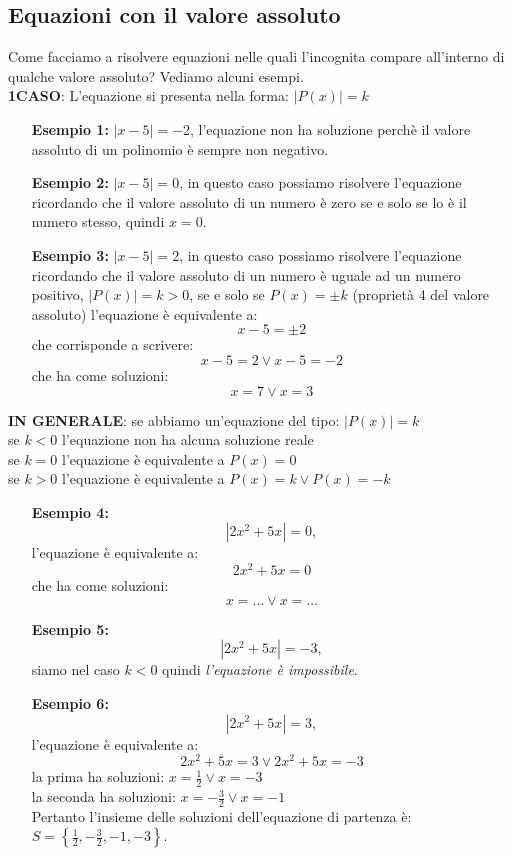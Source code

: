 \subsection{Equazioni con il valore assoluto}
Come facciamo a risolvere equazioni nelle quali l'incognita compare all'interno 
di qualche valore assoluto? Vediamo alcuni esempi.\\
\textbf{1\textdegree CASO}: L'equazione si presenta nella forma:  $|P(x)|=k$
\begin{enumerate}
        \item [\textbf{Esempio 1:}] $|x-5|=-2$, l'equazione non ha soluzione 
perchè il valore assoluto di un polinomio è sempre non negativo.
        \item [\textbf{Esempio 2:}] $|x-5|=0$, in questo caso possiamo 
risolvere 
l'equazione ricordando che il valore assoluto di un numero è zero se e solo se 
lo è il numero stesso, quindi $x=0$.
        \item [\textbf{Esempio 3:}] $|x-5|=2$, in  questo caso possiamo 
risolvere l'equazione ricordando che  il valore assoluto di un numero è uguale 
ad un numero positivo, $|P(x)|=k>0$, se e solo se $P(x)=\pm k$ (proprietà 4 del 
valore assoluto) l'equazione è equivalente a:
        $$x-5=\pm 2$$
        che corrisponde a scrivere:
                $$x-5= 2 \vee x-5=-2$$
                che ha come soluzioni:
                $$x=7 \vee x=3$$
\end{enumerate}
\textbf{IN GENERALE}: se abbiamo un'equazione del tipo: $|P(x)|=k$\\
se $k < 0$  l'equazione non ha alcuna soluzione reale\\
se $k = 0$  l'equazione è equivalente a  $P(x) = 0$\\
se $k > 0$   l'equazione è equivalente a  $P(x)=k \vee P(x)=-k$\\

\begin{enumerate}
        \item [\textbf{Esempio 4:}] $$|2x^2+5x|=0,$$ l'equazione è equivalente 
a:
        $$2x^2+5x=0$$
        che ha come soluzioni:
        $$x=\dots \vee x=\dots$$

        \item [\textbf{Esempio 5:}] $$|2x^2+5x|=-3,$$ siamo nel caso $k < 0$ 
quindi \emph{l'equazione è impossibile}.
        
        \item [\textbf{Esempio 6:}] $$|2x^2+5x|=3,$$ l'equazione è equivalente 
a:
        $$2x^2+5x=3 \vee 2x^2+5x=-3$$
        la prima ha soluzioni: $x=\frac{1}{2} \vee x=-3$\\
        la seconda ha soluzioni: $x=-\frac{3}{2} \vee x=-1$\\
        Pertanto l'insieme delle soluzioni dell'equazione di partenza è: 
$S=\left\lbrace \frac{1}{2},-\frac{3}{2},-1,-3\right\rbrace $. 
\end{enumerate}

